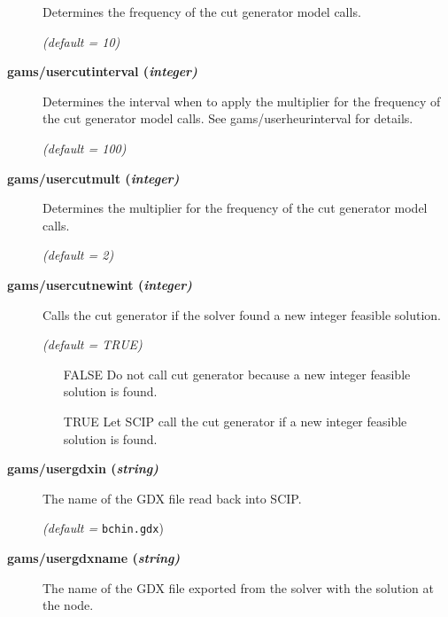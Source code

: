 \begin{description}
Determines the frequency of the cut generator model calls.

\textsl{(default = 10)}

\item[\label{scipusercutinterval}\hypertarget{scipusercutinterval}
{\textbf{gams/usercutinterval (\slshape{integer})}}]\hspace{1.0in}

Determines the interval when to apply the multiplier for the frequency of the cut generator model calls.
See gams/userheurinterval for details.

\textsl{(default = 100)}

\item[\label{scipusercutmult}\hypertarget{scipusercutmult}
{\textbf{gams/usercutmult (\slshape{integer})}}]\hspace{1.0in}

Determines the multiplier for the frequency of the cut generator model calls.

\textsl{(default = 2)}

\item[\label{scipusercutnewint}\hypertarget{scipusercutnewint}
{\textbf{gams/usercutnewint (\slshape{integer})}}]\hspace{1.0in}

Calls the cut generator if the solver found a new integer feasible solution.

\textsl{(default = TRUE)}
\begin{itemize}
\item[FALSE] Do not call cut generator because a new integer feasible solution is found.
\item[TRUE] Let SCIP call the cut generator if a new integer feasible solution is found.
\end{itemize}

\item[\label{scipusergdxin}\hypertarget{scipusergdxin}
{\textbf{gams/usergdxin (\slshape{string})}}]\hspace{1.0in}

The name of the GDX file read back into SCIP.

\textsl{(default =} \verb=bchin.gdx=)

\item[\label{scipusergdxname}\hypertarget{scipusergdxname}
{\textbf{gams/usergdxname (\slshape{string})}}]\hspace{1.0in}

The name of the GDX file exported from the solver with the solution at the node.


\end{description}
